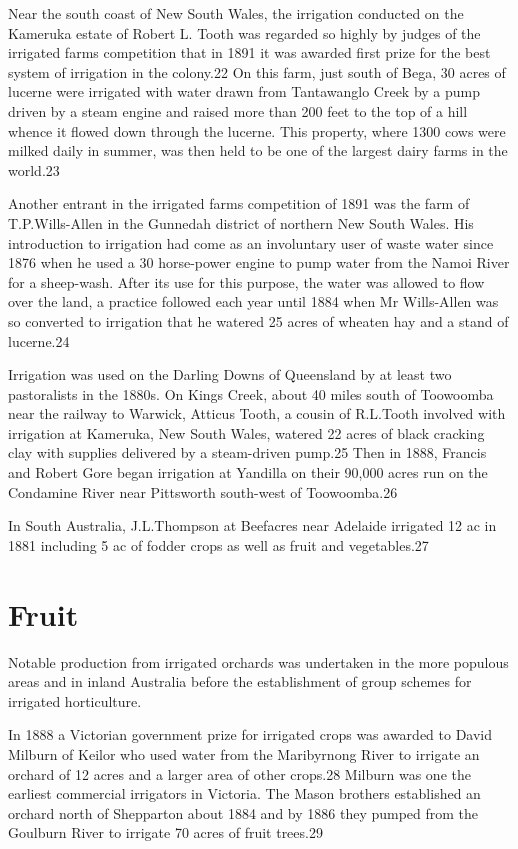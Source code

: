 Near the south coast of New South Wales, the irrigation conducted on
the Kameruka estate of Robert L. Tooth was regarded so highly by
judges of the irrigated farms competition that in 1891 it was awarded
first prize for the best system of irrigation in the colony.22 On this
farm, just south of Bega, 30 acres of lucerne were irrigated with
water drawn from Tantawanglo Creek by a pump driven by a steam engine
and raised more than 200 feet to the top of a hill whence it flowed
down through the lucerne. This property, where 1300 cows were milked
daily in summer, was then held to be one of the largest dairy farms in
the world.23

Another entrant in the irrigated farms competition of 1891 was the
farm of T.P.Wills-Allen in the Gunnedah district of northern New South
Wales. His introduction to irrigation had come as an involuntary user
of waste water since 1876 when he used a 30 horse-power engine to pump
water from the Namoi River for a sheep-wash. After its use for this
purpose, the water was allowed to flow over the land, a practice
followed each year until 1884 when Mr Wills-Allen was so converted to
irrigation that he watered 25 acres of wheaten hay and a stand of
lucerne.24

Irrigation was used on the Darling Downs of Queensland by at least two
pastoralists in the 1880s. On Kings Creek, about 40 miles south of
Toowoomba near the railway to Warwick, Atticus Tooth, a cousin of
R.L.Tooth involved with irrigation at Kameruka, New South Wales,
watered 22 acres of black cracking clay with supplies delivered by a
steam-driven pump.25 Then in 1888, Francis and Robert Gore began
irrigation at Yandilla on their 90,000 acres run on the Condamine
River near Pittsworth south-west of Toowoomba.26

	In South Australia, J.L.Thompson at Beefacres near Adelaide irrigated 12 ac in 1881 including 5 ac of fodder crops as well as fruit and vegetables.27

\section{Fruit}

Notable production from irrigated orchards was undertaken in the more
populous areas and in inland Australia before the establishment of
group schemes for irrigated horticulture.

In 1888 a Victorian government prize for irrigated crops was awarded to David Milburn of Keilor who used water from the Maribyrnong River to irrigate an orchard of 12 acres and a larger area of other crops.28 Milburn was one the earliest commercial irrigators in Victoria. The Mason brothers established an orchard north of Shepparton about 1884 and by 1886 they pumped from the Goulburn River to irrigate 70 acres of fruit trees.29

